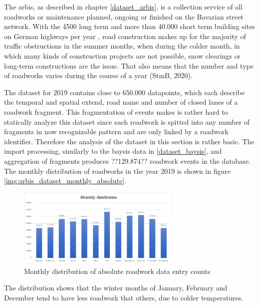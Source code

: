 \documentclass[a4paper,12pt]{report}
\begin{document}
The \acrfull{arbis}, as described in chapter \ref{dataset_arbis}, is a collection service of all roadworks or maintenance planned, ongoing or finished on the Bavarian street network. With the 4500 long term and more than 40.000 short term building sites on German highways per year \cite{LAPID2018,Stmi2020}, road construction makes up for the majority of traffic obstructions in the summer months, when during the colder month, in which many kinds of construction projects are not possible, snow clearings or long-term constructions are the issue. That also means that the number and type of roadworks varies during the course of a year (StmB, 2020).

The dataset for 2019 contains close to 650.000 datapoints, which each describe the temporal and spatial extend, road name and number of closed lanes of a roadwork fragment. This fragmentation of events makes is rather hard to statically analyze this dataset since each roadwork is spitted into any number of fragments in now recognizable pattern and are only linked by a roadwork identifier. Therefore the analysis of the dataset in this section is rather basic. The import processing, similarly to the \acrshort{baysis} data in \ref{dataset_baysis}, and aggregation of fragments produces ??129.874?? roadwork events in the database. The monthly distribution of roadworks in the year 2019 is shown in figure \ref{img:arbis_dataset_monthly_absolute}.

\begin{figure}[h]
	\centering
	\includegraphics[width=0.7\textwidth]{./assets/arbis_dataset_monthly_absolute}
	\caption{Monthly distribution of absolute roadwork data entry counts}
\end{figure}

The distribution shows that the winter months of January, February and December tend to have less roadwork that others, due to colder temperatures.

\end{document}
